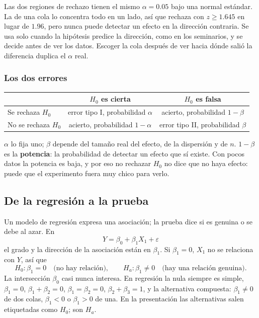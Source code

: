 \documentclass[11pt,letterpaper]{article}
\begin{document}
Las dos regiones de rechazo tienen el mismo $\alpha = 0.05$ bajo una
normal estándar. La de una cola lo concentra todo en un lado, así que
rechaza con $z \ge 1.645$ en lugar de $1.96$, pero nunca puede detectar
un efecto en la dirección contraria. Se usa solo cuando la hipótesis
predice la dirección, como en los seminarios, y se decide antes de ver
los datos. Escoger la cola después de ver hacia dónde salió la
diferencia duplica el $\alpha$ real.

\subsubsection*{Los dos errores}

\begin{center}
\small
\begin{tabular}{lcc}
    \toprule
    & \textbf{$H_0$ es cierta} & \textbf{$H_0$ es falsa} \\
    \midrule
    Se rechaza $H_0$ & error tipo I, probabilidad $\alpha$
                     & acierto, probabilidad $1 - \beta$ \\
    No se rechaza $H_0$ & acierto, probabilidad $1 - \alpha$
                        & error tipo II, probabilidad $\beta$ \\
    \bottomrule
\end{tabular}
\end{center}

$\alpha$ lo fija uno; $\beta$ depende del tamaño real del efecto, de la
dispersión y de $n$. $1 - \beta$ es la \textbf{potencia}: la
probabilidad de detectar un efecto que sí existe. Con pocos datos la
potencia es baja, y por eso no rechazar $H_0$ no dice que no haya
efecto: puede que el experimento fuera muy chico para verlo.


\subsection*{De la regresión a la prueba}

Un modelo de regresión expresa una asociación; la prueba dice si es
genuina o se debe al azar. En
\[
    Y = \beta_0 + \beta_1 X_1 + \varepsilon
\]
el grado y la dirección de la asociación están en $\beta_1$. Si
$\beta_1 = 0$, $X_1$ no se relaciona con $Y$, así que
\[
    H_0\colon \beta_1 = 0 \quad \text{(no hay relación)} ,
    \qquad
    H_a\colon \beta_1 \neq 0 \quad \text{(hay una relación genuina)} .
\]
La intersección $\beta_0$ casi nunca interesa. En regresión la nula
siempre es simple, $\beta_1 = 0$, $\beta_1 + \beta_2 = 0$,
$\beta_1 = \beta_2 = 0$, $\beta_2 + \beta_3 = 1$, y la alternativa
compuesta: $\beta_1 \neq 0$ de dos colas, $\beta_1 < 0$ o
$\beta_1 > 0$ de una. En la presentación las alternativas salen
etiquetadas como $H_0$; son $H_a$.
\end{document}
